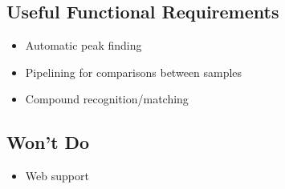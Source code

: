 \documentclass{article}
\begin{document}
\subsection*{Useful Functional Requirements}
\begin{itemize}
	\item Automatic peak finding
	\item Pipelining for comparisons between samples
	\item Compound recognition/matching
\end{itemize}
\subsection*{Won't Do}
\begin{itemize}
	\item Web support
\end{itemize}
\end{document}
